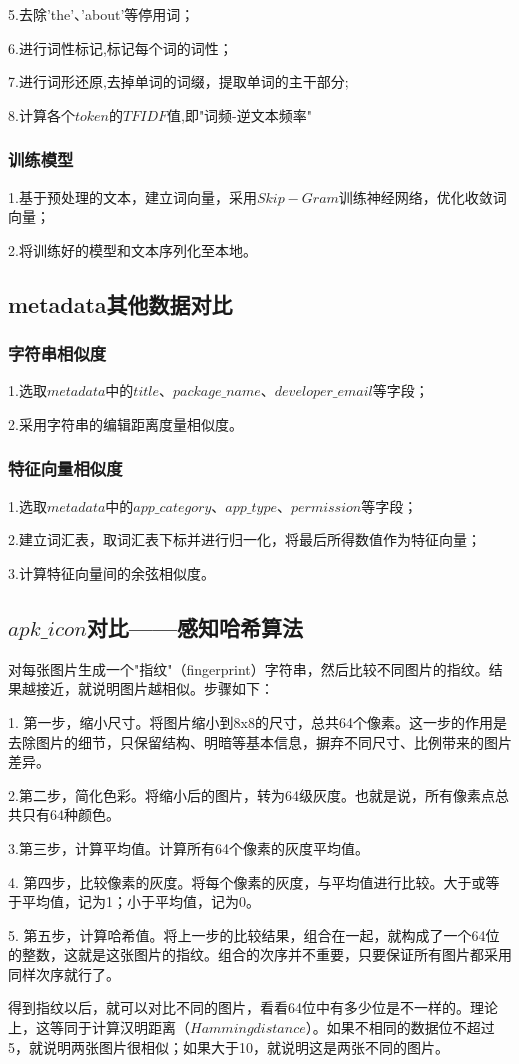 \documentclass[UTF8,a4paper,10pt, twocolumn]{ctexart}
\begin{document}
5.去除'the'、'about'等停用词；

6.进行词性标记,标记每个词的词性；

7.进行词形还原,去掉单词的词缀，提取单词的主干部分;

8.计算各个$token$的$TFIDF$值,即"词频-逆文本频率"

\subsubsection{训练模型}
1.基于预处理的文本，建立词向量，采用$Skip-Gram$训练神经网络，优化收敛词向量；

2.将训练好的模型和文本序列化至本地。

\subsection{metadata其他数据对比}
\subsubsection{字符串相似度}
1.选取$metadata$中的$title$、$package\_name$、$developer\_email$等字段；

2.采用字符串的编辑距离度量相似度。

\subsubsection{特征向量相似度}
1.选取$metadata$中的$app\_category$、$app\_type$、$permission$等字段；

2.建立词汇表，取词汇表下标并进行归一化，将最后所得数值作为特征向量；

3.计算特征向量间的余弦相似度。

\subsection{$apk\_icon$对比——感知哈希算法}
对每张图片生成一个"指纹"（fingerprint）字符串，然后比较不同图片的指纹。结果越接近，就说明图片越相似。步骤如下：

1. 第一步，缩小尺寸。将图片缩小到8x8的尺寸，总共64个像素。这一步的作用是去除图片的细节，只保留结构、明暗等基本信息，摒弃不同尺寸、比例带来的图片差异。

2.第二步，简化色彩。将缩小后的图片，转为64级灰度。也就是说，所有像素点总共只有64种颜色。

3.第三步，计算平均值。计算所有64个像素的灰度平均值。

4. 第四步，比较像素的灰度。将每个像素的灰度，与平均值进行比较。大于或等于平均值，记为1；小于平均值，记为0。

5. 第五步，计算哈希值。将上一步的比较结果，组合在一起，就构成了一个64位的整数，这就是这张图片的指纹。组合的次序并不重要，只要保证所有图片都采用同样次序就行了。

得到指纹以后，就可以对比不同的图片，看看64位中有多少位是不一样的。理论上，这等同于计算汉明距离（$Hamming distance$）。如果不相同的数据位不超过5，就说明两张图片很相似；如果大于10，就说明这是两张不同的图片。

\section{}
\end{document}
